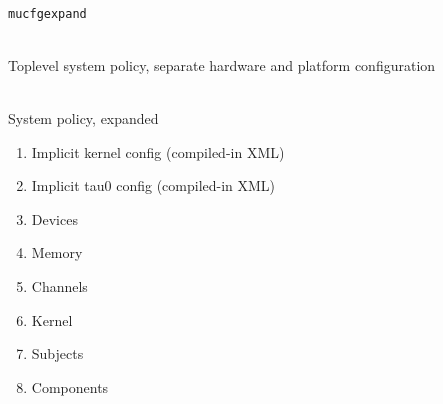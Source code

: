 \documentclass[a4paper,twoside,titlepage]{article}
\begin{document}
\begin{description} \itemsep1pt \parskip0pt
	\item[Name] \hfill \\
		\texttt{mucfgexpand}
	\item[Input] \hfill \\
		Toplevel system policy, separate hardware and platform configuration
	\item[Output] \hfill \\
		System policy, expanded
	\item[Data] \hfill
		\begin{enumerate}
			\item Implicit kernel config (compiled-in XML)
			\item Implicit tau0 config (compiled-in XML)
			\item Devices
			\item Memory
			\item Channels
			\item Kernel
			\item Subjects
			\item Components
		\end{enumerate}
\end{description}
\end{document}
